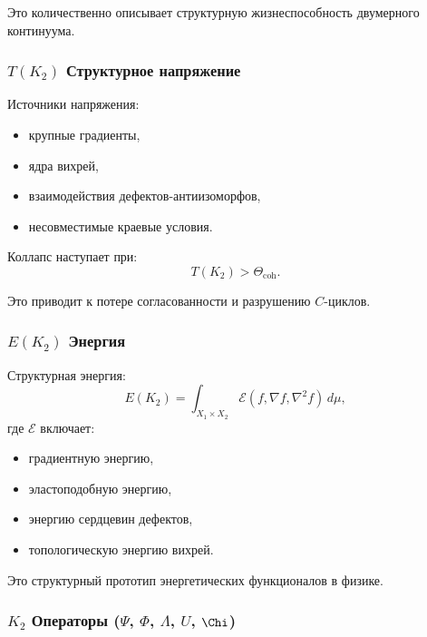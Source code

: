 Это количественно описывает структурную жизнеспособность двумерного континуума.

\subsubsection{\texorpdfstring{$T(K_2)$}{T(K_2)} Структурное напряжение}

Источники напряжения:
\begin{itemize}
    \item крупные градиенты,
    \item ядра вихрей,
    \item взаимодействия дефектов-антиизоморфов,
    \item несовместимые краевые условия.
\end{itemize}

Коллапс наступает при:
\[
T(K_2) > \Theta_{\mathrm{coh}}.
\]

Это приводит к потере согласованности и разрушению $C$-циклов.

\subsubsection{\texorpdfstring{$E(K_2)$}{E(K_2)} Энергия}

Структурная энергия:
\[
E(K_2) = \int_{X_1 \times X_2}
\mathcal{E}(f, \nabla f, \nabla^2 f)\, d\mu,
\]
где $\mathcal{E}$ включает:
\begin{itemize}
    \item градиентную энергию,
    \item эластоподобную энергию,
    \item энергию сердцевин дефектов,
    \item топологическую энергию вихрей.
\end{itemize}

Это структурный прототип энергетических функционалов в физике.

\subsubsection{\texorpdfstring{$K_2$}{K_2} Операторы (\texorpdfstring{$\Psi$}{\Psi}, \texorpdfstring{$\Phi$}{\Phi}, \texorpdfstring{$\Lambda$}{\Lambda}, \texorpdfstring{$U$}{U}, \texorpdfstring{$\Chi$}{\Chi})}

